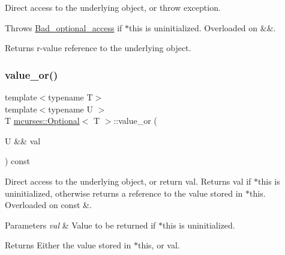 Direct access to the underlying object, or throw exception. 

Throws \hyperlink{classmcurses_1_1Bad__optional__access}{Bad\+\_\+optional\+\_\+access} if $\ast$this is uninitialized. Overloaded on \&\&. \begin{DoxyReturn}{Returns}
r-\/value reference to the underlying object. 
\end{DoxyReturn}
\hypertarget{classmcurses_1_1Optional_a047c51eb457fd6de52987bf991935f01}{}\label{classmcurses_1_1Optional_a047c51eb457fd6de52987bf991935f01} 
\subsubsection{\texorpdfstring{value\+\_\+or()}{value\_or()}\hspace{0.1cm}{\footnotesize\ttfamily [1/2]}}
{\footnotesize\ttfamily template$<$typename T$>$ \\
template$<$typename U $>$ \\
T \hyperlink{classmcurses_1_1Optional}{mcurses\+::\+Optional}$<$ T $>$\+::value\+\_\+or (\begin{DoxyParamCaption}\item[{U \&\&}]{val }\end{DoxyParamCaption}) const\hspace{0.3cm}{\ttfamily [inline]}}



Direct access to the underlying object, or return {\ttfamily val}. Returns {\ttfamily val} if $\ast$this is uninitialized, otherwise returns a reference to the value stored in $\ast$this. Overloaded on const \&. 


\begin{DoxyParams}{Parameters}
{\em val} & Value to be returned if $\ast$this is uninitialized. \\
\hline
\end{DoxyParams}
\begin{DoxyReturn}{Returns}
Either the value stored in $\ast$this, or {\ttfamily val}. 
\end{DoxyReturn}
\hypertarget{classmcurses_1_1Optional_aff211e864bc5bda6bc5b72298cdbadd3}{}\label{classmcurses_1_1Optional_aff211e864bc5bda6bc5b72298cdbadd3} 

